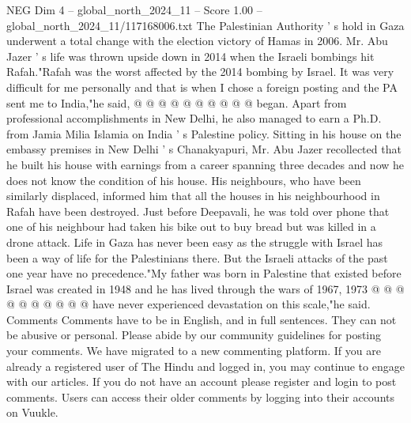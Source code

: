 \begin{textsample}{NEG Dim 4 – global\_north\_2024\_11 – Score 1.00 – global\_north\_2024\_11/117168006.txt}
The Palestinian Authority ' s hold in Gaza underwent a total change with the election victory of Hamas in 2006.
Mr.
Abu Jazer ' s life was thrown upside down in 2014 when the Israeli bombings hit Rafah."Rafah was the worst affected by the 2014 bombing by Israel.
It was very difficult for me personally and that is when I chose a foreign posting and the PA sent me to India,"he said, @ @ @ @ @ @ @ @ @ @ began.
Apart from professional accomplishments in New Delhi, he also managed to earn a Ph.D. from Jamia Milia Islamia on India ' s Palestine policy.
Sitting in his house on the embassy premises in New Delhi ' s Chanakyapuri, Mr.
Abu Jazer recollected that he built his house with earnings from a career spanning three decades and now he does not know the condition of his house.
His neighbours, who have been similarly displaced, informed him that all the houses in his neighbourhood in Rafah have been destroyed.
Just before Deepavali, he was told over phone that one of his neighbour had taken his bike out to buy bread but was killed in a drone attack.
Life in Gaza has never been easy as the struggle with Israel has been a way of life for the Palestinians there.
But the Israeli attacks of the past one year have no precedence."My father was born in Palestine that existed before Israel was created in 1948 and he has lived through the wars of 1967, 1973 @ @ @ @ @ @ @ @ @ @ have never experienced devastation on this scale,"he said.
Comments Comments have to be in English, and in full sentences.
They can not be abusive or personal.
Please abide by our community guidelines for posting your comments.
We have migrated to a new commenting platform.
If you are already a registered user of The Hindu and logged in, you may continue to engage with our articles.
If you do not have an account please register and login to post comments.
Users can access their older comments by logging into their accounts on Vuukle.

\end{textsample}
